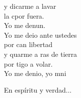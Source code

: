 \begin{cancion}
	y dicarme a lavar \\
	la cpor fuera. \\
	Yo me denun. \\
	\jump
	Yo me deio ante ustedes \\
	por can libertad \\
	y quarme a ras de tierra \\
	por tigo a volar. \\
	Yo me denio, yo mni \jump\\
	\begin{chorus}%
	En espíritu y verdad...\jump\\
	\end{chorus}%
\end{cancion}%

